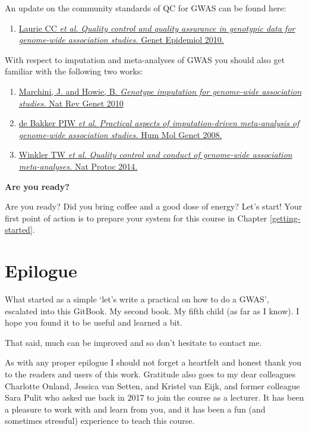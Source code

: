\documentclass[
]{book}
\providecommand{\tightlist}{%
  \setlength{\itemsep}{0pt}\setlength{\parskip}{0pt}}
\begin{document}
An update on the community standards of QC for GWAS can be found here:

\begin{enumerate}
\def\labelenumi{\arabic{enumi}.}
\tightlist
\item
  \href{https://www.ncbi.nlm.nih.gov/pubmed/20718045}{Laurie CC \emph{et al.} \emph{Quality control and quality assurance in genotypic data for genome-wide association studies.} Genet Epidemiol 2010.}
\end{enumerate}

With respect to imputation and meta-analyses of GWAS you should also get familiar with the following two works:

\begin{enumerate}
\def\labelenumi{\arabic{enumi}.}
\tightlist
\item
  \href{https://doi.org/10.1038/nrg2796}{Marchini, J. and Howie, B. \emph{Genotype imputation for genome-wide association studies.} Nat Rev Genet 2010}
\item
  \href{https://www.ncbi.nlm.nih.gov/pubmed/18852200}{de Bakker PIW \emph{et al.} \emph{Practical aspects of imputation-driven meta-analysis of genome-wide association studies.} Hum Mol Genet 2008.}
\item
  \href{https://www.ncbi.nlm.nih.gov/pubmed/24762786}{Winkler TW \emph{et al.} \emph{Quality control and conduct of genome-wide association meta-analyses.} Nat Protoc 2014.}
\end{enumerate}

\textbf{Are you ready?}

Are you ready? Did you bring coffee and a good dose of energy? Let's start! Your first point of action is to prepare your system for this course in Chapter \ref{getting-started}.

\hypertarget{epilogue}{%
\chapter{Epilogue}\label{epilogue}}

What started as a simple `let's write a practical on how to do a GWAS', escalated into this GitBook. My second book. My fifth child (as far as I know). I hope you found it to be useful and learned a bit.

That said, much can be improved and so don't hesitate to contact me.

As with any proper epilogue I should not forget a heartfelt and honest thank you to the readers and users of this work. Gratitude also goes to my dear colleagues Charlotte Onland, Jessica van Setten, and Kristel van Eijk, and former colleague Sara Pulit who asked me back in 2017 to join the course as a lecturer. It has been a pleasure to work with and learn from you, and it has been a fun (and sometimes stressful) experience to teach this course.
\end{document}
